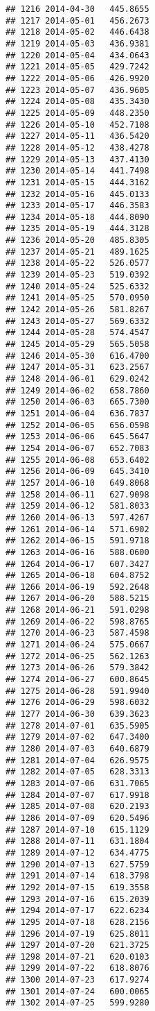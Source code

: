 \documentclass[
]{article}
\begin{document}
\begin{verbatim}
## 1216 2014-04-30   445.8655
## 1217 2014-05-01   456.2673
## 1218 2014-05-02   446.6438
## 1219 2014-05-03   436.9381
## 1220 2014-05-04   434.0643
## 1221 2014-05-05   429.7242
## 1222 2014-05-06   426.9920
## 1223 2014-05-07   436.9605
## 1224 2014-05-08   435.3430
## 1225 2014-05-09   448.2350
## 1226 2014-05-10   452.7108
## 1227 2014-05-11   436.5420
## 1228 2014-05-12   438.4278
## 1229 2014-05-13   437.4130
## 1230 2014-05-14   441.7498
## 1231 2014-05-15   444.3162
## 1232 2014-05-16   445.0133
## 1233 2014-05-17   446.3583
## 1234 2014-05-18   444.8090
## 1235 2014-05-19   444.3128
## 1236 2014-05-20   485.8305
## 1237 2014-05-21   489.1625
## 1238 2014-05-22   526.0577
## 1239 2014-05-23   519.0392
## 1240 2014-05-24   525.6332
## 1241 2014-05-25   570.0950
## 1242 2014-05-26   581.8267
## 1243 2014-05-27   569.6332
## 1244 2014-05-28   574.4547
## 1245 2014-05-29   565.5058
## 1246 2014-05-30   616.4700
## 1247 2014-05-31   623.2567
## 1248 2014-06-01   629.0242
## 1249 2014-06-02   658.7860
## 1250 2014-06-03   665.7300
## 1251 2014-06-04   636.7837
## 1252 2014-06-05   656.0598
## 1253 2014-06-06   645.5647
## 1254 2014-06-07   652.7083
## 1255 2014-06-08   653.6402
## 1256 2014-06-09   645.3410
## 1257 2014-06-10   649.8068
## 1258 2014-06-11   627.9098
## 1259 2014-06-12   581.8033
## 1260 2014-06-13   597.4267
## 1261 2014-06-14   571.6902
## 1262 2014-06-15   591.9718
## 1263 2014-06-16   588.0600
## 1264 2014-06-17   607.3427
## 1265 2014-06-18   604.8752
## 1266 2014-06-19   592.2648
## 1267 2014-06-20   588.5215
## 1268 2014-06-21   591.0298
## 1269 2014-06-22   598.8765
## 1270 2014-06-23   587.4598
## 1271 2014-06-24   575.0667
## 1272 2014-06-25   562.1263
## 1273 2014-06-26   579.3842
## 1274 2014-06-27   600.8645
## 1275 2014-06-28   591.9940
## 1276 2014-06-29   598.6032
## 1277 2014-06-30   639.3623
## 1278 2014-07-01   635.5905
## 1279 2014-07-02   647.3400
## 1280 2014-07-03   640.6879
## 1281 2014-07-04   626.9575
## 1282 2014-07-05   628.3313
## 1283 2014-07-06   631.7065
## 1284 2014-07-07   617.9918
## 1285 2014-07-08   620.2193
## 1286 2014-07-09   620.5496
## 1287 2014-07-10   615.1129
## 1288 2014-07-11   631.1804
## 1289 2014-07-12   634.4775
## 1290 2014-07-13   627.5759
## 1291 2014-07-14   618.3798
## 1292 2014-07-15   619.3558
## 1293 2014-07-16   615.2039
## 1294 2014-07-17   622.6234
## 1295 2014-07-18   628.2156
## 1296 2014-07-19   625.8011
## 1297 2014-07-20   621.3725
## 1298 2014-07-21   620.0103
## 1299 2014-07-22   618.8076
## 1300 2014-07-23   617.9274
## 1301 2014-07-24   600.0065
## 1302 2014-07-25   599.9280

\end{verbatim}
\end{document}
